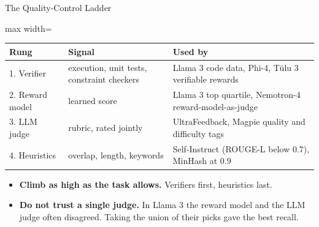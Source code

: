 \begin{frame}{The Quality-Control Ladder}
    \begin{center}
    \small
    \begin{adjustbox}{max width=\linewidth}\begin{tabular}{l>{\raggedright\arraybackslash}p{4.3cm}>{\raggedright\arraybackslash}p{6.6cm}}
        \toprule
        \textbf{Rung} & \textbf{Signal} & \textbf{Used by} \\
        \midrule
        \rowcolor{KAUSTcyan!12} 1. Verifier & execution, unit tests, constraint checkers & Llama 3 code data, Phi-4, T\"ulu 3 verifiable rewards \\
        2. Reward model & learned score & Llama 3 top quartile, Nemotron-4 reward-model-as-judge \\
        3. LLM judge & rubric, rated jointly & UltraFeedback, Magpie quality and difficulty tags \\
        4. Heuristics & overlap, length, keywords & Self-Instruct (ROUGE-L below 0.7), MinHash at 0.9 \\
        \bottomrule
    \end{tabular}\end{adjustbox}
    \end{center}
    \begin{itemize}\itemsep0.4em
        \item \textbf{Climb as high as the task allows.} Verifiers first, heuristics last.
        \item \textbf{Do not trust a single judge.} In Llama 3 the reward model and the LLM judge often disagreed. Taking the union of their picks gave the best recall.
    \end{itemize}
\end{frame}

